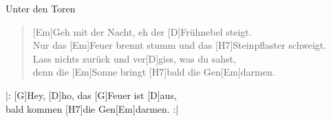 \begin{song}{Unter den Toren}{}

    \begin{verse}  
        [Em]Geh mit der Nacht, eh der [D]Frühnebel steigt. \\
        Nur das [Em]Feuer brennt stumm und das [H7]Steinpflaster schweigt. \\
        [Em]Lass nichts zurück und ver[D]giss, was du sahst, \\
        denn die [Em]Sonne bringt [H7]bald die Gen[Em]darmen.
    \end{verse}  

    \begin{chorus}
        |: [G]Hey, [D]ho, das [G]Feuer ist [D]aus, \\
        [Em]bald kommen [H7]die Gen[Em]darmen. :|
    \end{chorus}

\end{song}
